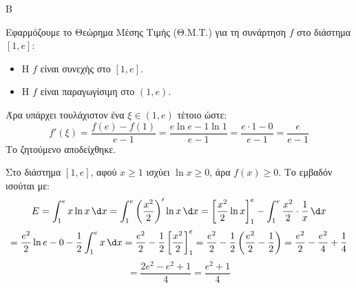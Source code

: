 \begin{thema}{Β}
\begin{erwthma}
\item Εφαρμόζουμε το Θεώρημα Μέσης Τιμής (Θ.Μ.Τ.) για τη συνάρτηση $f$ στο διάστημα $[1, e]$:
\begin{itemize}
\item Η $f$ είναι συνεχής στο $[1, e]$.
\item Η $f$ είναι παραγωγίσιμη στο $(1, e)$.
\end{itemize}
Άρα υπάρχει τουλάχιστον ένα $\xi \in (1, e)$ τέτοιο ώστε:
\[ f'(\xi) = \frac{f(e) - f(1)}{e - 1} = \frac{e\ln e - 1\ln 1}{e - 1} = \frac{e\cdot 1 - 0}{e-1} = \frac{e}{e-1} \]
Το ζητούμενο αποδείχθηκε.

\item Στο διάστημα $[1, e]$, αφού $x \ge 1$ ισχύει $\ln x \ge 0$, άρα $f(x) \ge 0$. Το εμβαδόν ισούται με:
\[ E = \int_1^e x \ln x\,\d x = \int_1^e \left(\frac{x^2}{2}\right)' \ln x\,\d x = \left[ \frac{x^2}{2} \ln x \right]_1^e - \int_1^e \frac{x^2}{2} \cdot \frac{1}{x}\,\d x \]
\[ = \frac{e^2}{2} \ln e - 0 - \frac{1}{2} \int_1^e x\,\d x = \frac{e^2}{2} - \frac{1}{2} \left[ \frac{x^2}{2} \right]_1^e = \frac{e^2}{2} - \frac{1}{2} \left( \frac{e^2}{2} - \frac{1}{2} \right) = \frac{e^2}{2} - \frac{e^2}{4} + \frac{1}{4} \]
\[ = \frac{2e^2 - e^2 + 1}{4} = \frac{e^2+1}{4} \]
\end{erwthma}
\end{thema}

